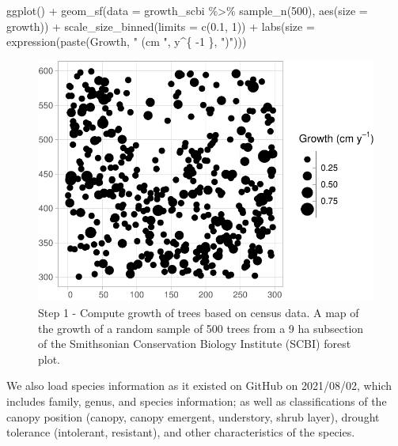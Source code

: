 \documentclass[12pt]{article}
\newenvironment{Shaded}{\begin{snugshade}}{\end{snugshade}}
\newcommand{\AttributeTok}[1]{\textcolor[rgb]{0.77,0.63,0.00}{#1}}
\newcommand{\DecValTok}[1]{\textcolor[rgb]{0.00,0.00,0.81}{#1}}
\newcommand{\FloatTok}[1]{\textcolor[rgb]{0.00,0.00,0.81}{#1}}
\newcommand{\FunctionTok}[1]{\textcolor[rgb]{0.00,0.00,0.00}{#1}}
\newcommand{\NormalTok}[1]{#1}
\newcommand{\SpecialCharTok}[1]{\textcolor[rgb]{0.00,0.00,0.00}{#1}}
\newcommand{\StringTok}[1]{\textcolor[rgb]{0.31,0.60,0.02}{#1}}
\begin{document}
\begin{Shaded}
\begin{Highlighting}[]
\FunctionTok{ggplot}\NormalTok{() }\SpecialCharTok{+} \FunctionTok{geom\_sf}\NormalTok{(}\AttributeTok{data =}\NormalTok{ growth\_scbi }\SpecialCharTok{\%\textgreater{}\%}
    \FunctionTok{sample\_n}\NormalTok{(}\DecValTok{500}\NormalTok{), }\FunctionTok{aes}\NormalTok{(}\AttributeTok{size =}\NormalTok{ growth)) }\SpecialCharTok{+} \FunctionTok{scale\_size\_binned}\NormalTok{(}\AttributeTok{limits =} \FunctionTok{c}\NormalTok{(}\FloatTok{0.1}\NormalTok{,}
    \DecValTok{1}\NormalTok{)) }\SpecialCharTok{+} \FunctionTok{labs}\NormalTok{(}\AttributeTok{size =} \FunctionTok{expression}\NormalTok{(}\FunctionTok{paste}\NormalTok{(Growth, }\StringTok{" (cm "}\NormalTok{, y}\SpecialCharTok{\^{}}\NormalTok{\{}
    \SpecialCharTok{{-}}\DecValTok{1}
\NormalTok{\}, }\StringTok{")"}\NormalTok{)))}
\end{Highlighting}
\end{Shaded}

\begin{figure}

{\centering \includegraphics[width=0.66\linewidth]{Figures/scbi-trees-1} 

}

\caption{Step 1 - Compute growth of trees based on census data. A map of the growth of a random sample of 500 trees from a 9 ha subsection of the Smithsonian Conservation Biology Institute (SCBI) forest plot.}\label{fig:scbi-trees}
\end{figure}

We also load species information as it existed on GitHub on 2021/08/02,
which includes family, genus, and species information; as well as
classifications of the canopy position (canopy, canopy emergent,
understory, shrub layer), drought tolerance (intolerant, resistant), and
other characteristics of the species.
\end{document}
